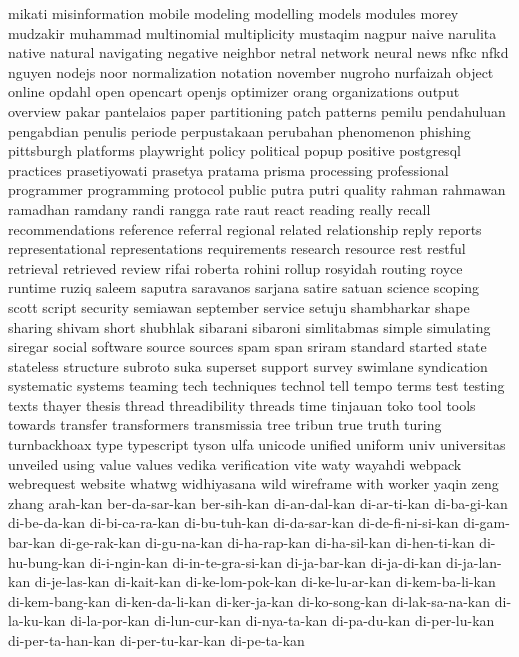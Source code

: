 {  mikati misinformation mobile modeling modelling models modules morey
  mudzakir muhammad multinomial multiplicity mustaqim nagpur naive narulita
  native natural navigating negative neighbor netral network neural
  news nfkc nfkd nguyen nodejs noor normalization notation
  november nugroho nurfaizah object online opdahl open opencart
  openjs optimizer orang organizations output overview pakar pantelaios
  paper partitioning patch patterns pemilu pendahuluan pengabdian penulis
  periode perpustakaan perubahan phenomenon phishing pittsburgh platforms playwright
  policy political popup positive postgresql practices prasetiyowati prasetya
  pratama prisma processing professional programmer programming protocol public
  putra putri quality rahman rahmawan ramadhan ramdany randi
  rangga rate raut react reading really recall recommendations
  reference referral regional related relationship reply reports representational
  representations requirements research resource rest restful retrieval retrieved
  review rifai roberta rohini rollup rosyidah routing royce
  runtime ruziq saleem saputra saravanos sarjana satire satuan
  science scoping scott script security semiawan september service
  setuju shambharkar shape sharing shivam short shubhlak sibarani
  sibaroni simlitabmas simple simulating siregar social software source
  sources spam span sriram standard started state stateless
  structure subroto suka superset support survey swimlane syndication
  systematic systems teaming tech techniques technol tell tempo
  terms test testing texts thayer thesis thread threadibility
  threads time tinjauan toko tool tools towards transfer
  transformers transmissia tree tribun true truth turing turnbackhoax
  type typescript tyson ulfa unicode unified uniform univ
  universitas unveiled using value values vedika verification vite
  waty wayahdi webpack webrequest website whatwg widhiyasana wild
  wireframe with worker yaqin zeng zhang
  arah-kan ber-da-sar-kan ber-sih-kan di-an-dal-kan di-ar-ti-kan di-ba-gi-kan
  di-be-da-kan di-bi-ca-ra-kan di-bu-tuh-kan di-da-sar-kan di-de-fi-ni-si-kan di-gam-bar-kan
  di-ge-rak-kan di-gu-na-kan di-ha-rap-kan di-ha-sil-kan di-hen-ti-kan di-hu-bung-kan
  di-i-ngin-kan di-in-te-gra-si-kan di-ja-bar-kan di-ja-di-kan di-ja-lan-kan di-je-las-kan
  di-kait-kan di-ke-lom-pok-kan di-ke-lu-ar-kan di-kem-ba-li-kan di-kem-bang-kan di-ken-da-li-kan
  di-ker-ja-kan di-ko-song-kan di-lak-sa-na-kan di-la-ku-kan di-la-por-kan di-lun-cur-kan
  di-nya-ta-kan di-pa-du-kan di-per-lu-kan di-per-ta-han-kan di-per-tu-kar-kan di-pe-ta-kan
}

